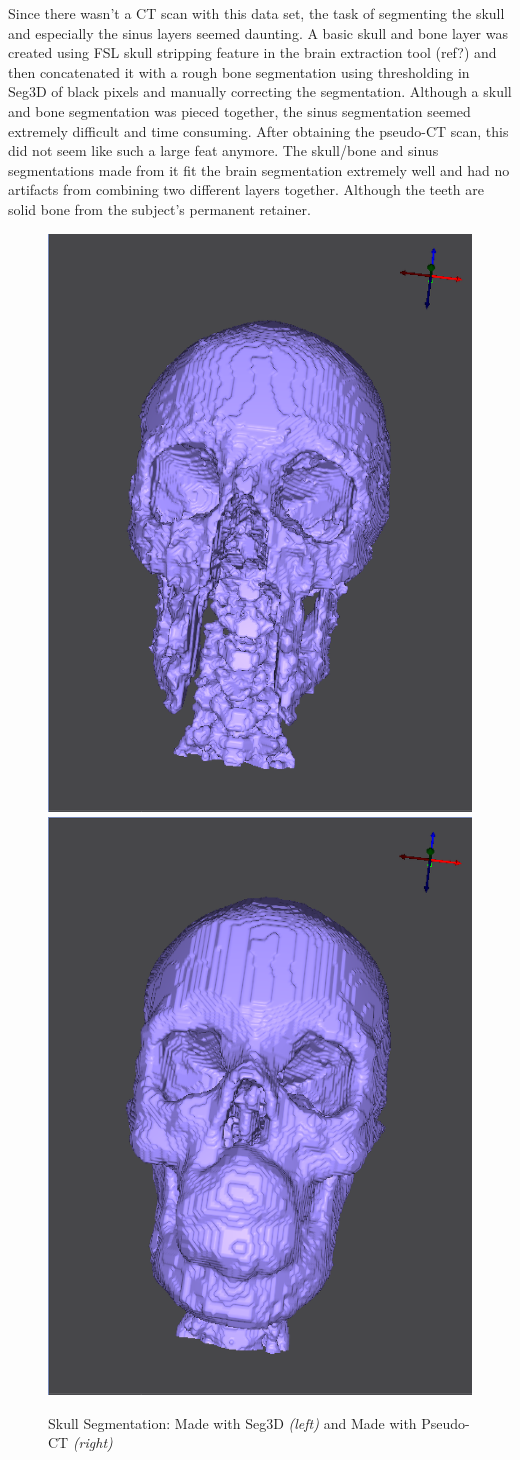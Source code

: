 Since there wasn't a CT scan with this data set, the task of segmenting the skull and especially the sinus layers seemed daunting. A basic skull and bone layer was created using FSL skull stripping feature in the brain extraction tool (ref?) and then concatenated it with a rough bone segmentation using thresholding in Seg3D of black pixels and manually correcting the segmentation. Although a skull and bone segmentation was pieced together, the sinus segmentation seemed extremely difficult and time consuming. After obtaining the pseudo-CT scan, this did not seem like such a large feat anymore. The skull/bone and sinus segmentations made from it fit the brain segmentation extremely well and had no artifacts from combining two different layers together. Although the teeth are solid bone from the subject's permanent retainer.

\begin{figure}[H]
\begin{center}
\includegraphics[width=.49\textwidth]{Figures/skull_before}
\includegraphics[width=.49\textwidth]{Figures/skull_after}
\caption{Skull Segmentation: Made with Seg3D \textit{(left)} and Made with Pseudo-CT \textit{(right)}}
\label{fig:skull}
\end{center}
\end{figure}

